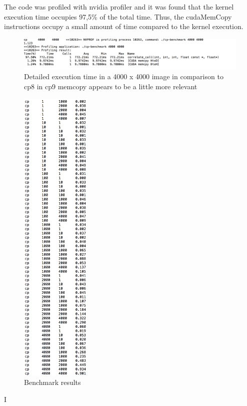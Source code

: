 \documentclass[a4paper,10pt]{article}
\begin{document}
The code was profiled with nvidia profiler and it was found that the kernel execution time occupies 97,5\% of the total time. Thus, the cudaMemCopy instructions occupy a small amount of time compared to the kernel execution. 

\begin{figure}[H]
\centering
\includegraphics[width=1.3\textwidth]{figures/w5_timing}
\caption{Detailed execution time in a 4000 x 4000 image in comparison to cp8 in cp9 memcopy appears to be a little more relevant}
\label{fig:pca_type}
\end{figure}

\begin{figure}[H]
\centering
\includegraphics[width=0.3\textwidth]{figures/w5_benchmark}
\caption{Benchmark results}
\label{fig:pca_type}
\end{figure}




I
\end{document}
